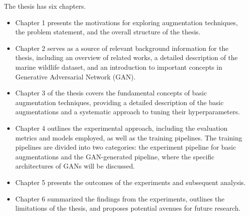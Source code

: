 The thesis has six chapters.

\begin{itemize}
    \item Chapter 1 presents the motivations for exploring augmentation techniques, the problem statement, and the overall structure of the thesis.
    \item Chapter 2 serves as a source of relevant background information for the thesis, including an overview of related works, a detailed description of the marine wildlife dataset, and an introduction to important concepts in Generative Adversarial Network (GAN).
    \item Chapter 3 of the thesis covers the fundamental concepts of basic augmentation techniques, providing a detailed description of the basic augmentations and a systematic approach to tuning their hyperparameters.
    \item Chapter 4 outlines the experimental approach, including the evaluation metrics and models employed, as well as the training pipelines. The training pipelines are divided into two categories: the experiment pipeline for basic augmentations and the GAN-generated pipeline, where the specific architectures of GANs will be discussed.
    \item Chapter 5 presents the outcomes of the experiments and subsequent analysis.
    \item Chapter 6 summarized the findings from the experiments, outlines the limitations of the thesis, and proposes potential avenues for future research.
\end{itemize}










